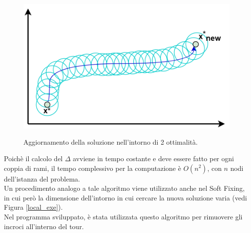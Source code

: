 \begin{figure}[H] 
\begin{center} 
  \includegraphics[scale=0.3]{Images/two_optimality}\\ 
  \caption{\footnotesize{Aggiornamento della soluzione nell'intorno di 2 ottimalità.}}
  \label{two_optimality}
\end{center}
\end{figure}
Poichè il calcolo del $\Delta$ avviene in tempo costante e deve essere fatto per ogni coppia di rami, il tempo complessivo per la computazione è $O(n^2)$, con $n$ nodi dell'istanza del problema.\\
Un procedimento analogo a tale algoritmo viene utilizzato anche nel Soft Fixing, in cui però la dimensione dell'intorno in cui cercare la nuova soluzione varia (vedi Figura \ref{local_exe}).\\
Nel programma sviluppato, è stata utilizzata questo algoritmo per rimuovere gli incroci all'interno del tour.
 
